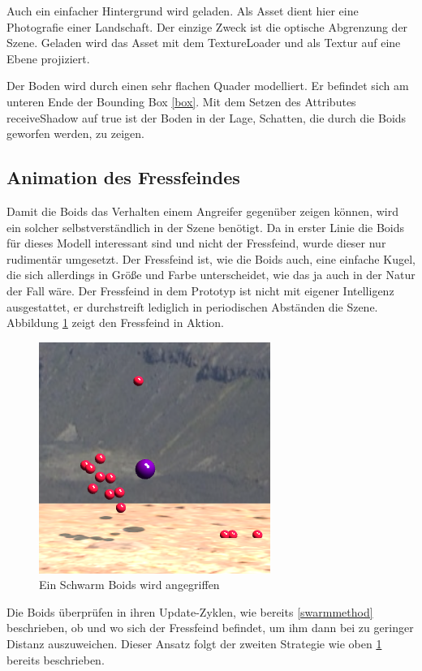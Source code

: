 \documentclass[draft=false
              ,paper=a4
              ,twoside=false
              ,fontsize=11pt
              ,headsepline
              ,BCOR10mm
              ,DIV11
              ,bibtotoc
              ,liststotoc
              ]{scrbook}
\begin{document}
Auch ein einfacher Hintergrund wird geladen. Als Asset dient hier eine Photografie einer Landschaft. Der einzige Zweck ist die optische Abgrenzung der Szene. Geladen wird das Asset mit dem TextureLoader und als Textur auf eine Ebene projiziert.

Der Boden wird durch einen sehr flachen Quader modelliert. Er befindet sich am unteren Ende der Bounding Box \ref{box}. Mit dem Setzen des Attributes receiveShadow auf true ist der Boden in der Lage, Schatten, die durch die Boids geworfen werden, zu zeigen.

\subsection{Animation des Fressfeindes}
Damit die Boids das Verhalten einem Angreifer gegenüber zeigen können, wird ein solcher selbstverständlich in der Szene benötigt. Da in erster Linie die Boids für dieses Modell interessant sind und nicht der Fressfeind, wurde dieser nur rudimentär umgesetzt. Der Fressfeind ist, wie die Boids auch, eine einfache Kugel, die sich allerdings in Größe und Farbe unterscheidet, wie das ja auch in der Natur der Fall wäre. Der Fressfeind in dem Prototyp ist nicht mit eigener Intelligenz ausgestattet, er durchstreift lediglich in periodischen Abständen die Szene. Abbildung \ref{enemy} zeigt den Fressfeind in Aktion.

\begin{figure}[!h]
\centering
\includegraphics[scale=0.8]{project/enemy.png}
\caption{Ein Schwarm Boids wird angegriffen}
\label{enemy}
\end{figure}

Die Boids überprüfen in ihren Update-Zyklen, wie bereits \ref{swarmmethod} beschrieben, ob und wo sich der Fressfeind befindet, um ihm dann bei zu geringer Distanz auszuweichen. Dieser Ansatz folgt der zweiten Strategie wie oben \ref{enemy} bereits beschrieben.
\end{document}
